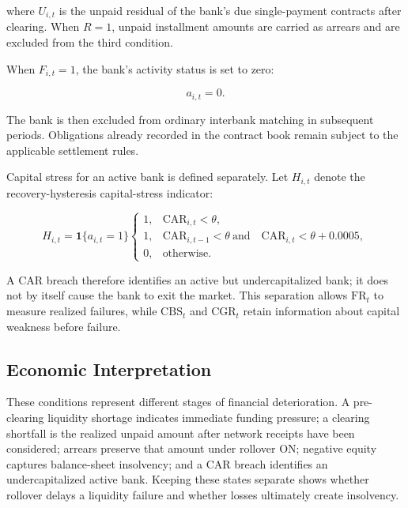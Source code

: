 where \(U_{i,t}\) is the unpaid residual of the bank's due
single-payment contracts after clearing. When \(R=1\), unpaid installment
amounts are carried as arrears and are excluded from the third condition.

When \(F_{i,t} = 1\), the bank's activity status is set to zero:


\begin{equation}
a_{i,t}=0.
\end{equation}


The bank is then excluded from ordinary interbank matching in subsequent
periods. Obligations already recorded in the contract book remain
subject to the applicable settlement rules.

Capital stress for an active bank is defined separately. Let
\(H_{i,t}\) denote the recovery-hysteresis capital-stress indicator:


\begin{equation}
H_{i,t}=\mathbf{1}\{a_{i,t}=1\}
\begin{cases}
1, & \mathrm{CAR}_{i,t}<\theta,\\
1, & \mathrm{CAR}_{i,t-1}<\theta\ \text{and}\quad
     \mathrm{CAR}_{i,t}<\theta+0.0005,\\
0, & \text{otherwise}.
\end{cases}
\label{eq:capital-stress-indicator}
\end{equation}


A CAR breach therefore identifies an active but undercapitalized bank;
it does not by itself cause the bank to exit the market. This separation
allows \(\mathrm{FR}_t\) to measure realized failures, while \(\mathrm{CBS}_t\) and
\(\mathrm{CGR}_t\) retain information about capital weakness before failure.

\subsection{Economic Interpretation}

These conditions represent different stages of financial deterioration.
A pre-clearing liquidity shortage indicates immediate funding pressure;
a clearing shortfall is the realized unpaid amount after network receipts
have been considered; arrears preserve that amount under rollover ON;
negative equity captures balance-sheet insolvency; and a CAR breach
identifies an undercapitalized active bank. Keeping these states separate
shows whether rollover delays a liquidity failure and whether losses
ultimately create insolvency.

